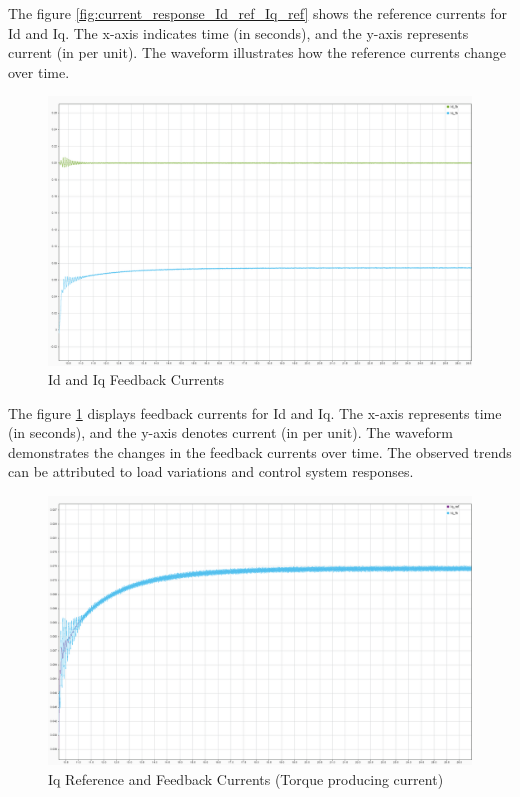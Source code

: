 The figure \ref{fig:current_response_Id_ref_Iq_ref} shows the reference currents for Id and Iq. The x-axis indicates time (in seconds), and the y-axis represents current (in per unit). The waveform illustrates how the reference currents change over time.


\begin{figure}[H]
	\centering
	\includegraphics[width=6in]{sections/section3/images/simulationResutls/Id_fb_Iq_fb.png}
	\caption{Id and Iq Feedback Currents}
	\label{fig:current_response_Id_fb_Iq_fb}
\end{figure}


The figure \ref{fig:current_response_Id_fb_Iq_fb} displays feedback currents for Id and Iq. The x-axis represents time (in seconds), and the y-axis denotes current (in per unit). The waveform demonstrates the changes in the feedback currents over time. The observed trends can be attributed to load variations and control system responses.



\begin{figure}[H]
	\centering
	\includegraphics[width=6in]{sections/section3/images/simulationResutls/Iq_ref_fb.png}
	\caption{Iq Reference and Feedback Currents (Torque producing current)}
	\label{fig:current_response_Iq_ref_fb}
\end{figure}

